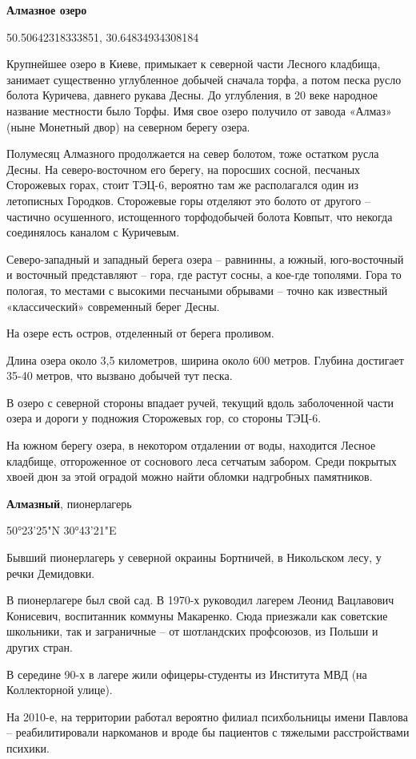 \textbf{Алмазное озеро}

50.50642318333851, 30.64834934308184

Крупнейшее озеро в Киеве, примыкает к северной части Лесного кладбища, занимает существенно углубленное добычей сначала торфа, а потом песка русло болота Куричева, давнего рукава Десны. До углубления, в 20 веке народное название местности было Торфы. Имя свое озеро получило от завода «Алмаз» (ныне Монетный двор) на северном берегу озера.

Полумесяц Алмазного продолжается на север болотом, тоже остатком русла Десны. На северо-восточном его берегу, на поросших сосной, песчаных Сторожевых горах, стоит ТЭЦ-6, вероятно там же располагался один из летописных Городков. Сторожевые горы отделяют это болото от другого – частично осушенного, истощенного торфодобычей болота Ковпыт, что некогда соединялось каналом с Куричевым.

Северо-западный и западный берега озера – равнинны, а южный, юго-восточный и восточный представляют – гора, где растут сосны, а кое-где тополями. Гора то пологая, то местами с высокими песчаными обрывами – точно как известный «классический» современный берег Десны. 

На озере есть остров, отделенный от берега проливом.

Длина озера около 3,5 километров, ширина около 600 метров. Глубина достигает 35-40 метров, что вызвано добычей тут песка.

В озеро с северной стороны впадает ручей, текущий вдоль заболоченной части озера и дороги у подножия Сторожевых гор, со стороны ТЭЦ-6.

На южном берегу озера, в некотором отдалении от воды, находится Лесное кладбище, отгороженное от соснового леса сетчатым забором. Среди покрытых хвоей дюн за этой оградой можно найти обломки надгробных памятников.\\

\medskip


\textbf{Алмазный}, пионерлагерь

50°23'25"N 30°43'21"E

Бывший пионерлагерь у северной окраины Бортничей, в Никольском лесу, у речки Демидовки.

В пионерлагере был свой сад. В 1970-х руководил лагерем Леонид Вацлавович Конисевич, воспитанник коммуны Макаренко. Сюда приезжали как советские школьники, так и заграничные – от шотландских профсоюзов, из Польши и других стран.

В середине 90-х в лагере жили офицеры-студенты из Института МВД (на Коллекторной улице).

На 2010-е, на территории работал вероятно филиал психбольницы имени Павлова – реабилитировали наркоманов и вроде бы пациентов с тяжелыми расстройствами психики.
